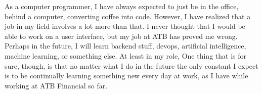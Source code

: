 \documentclass[letterpaper,12pt]{article}
\begin{document}
As a computer programmer, I have always expected to just be in the office, behind a computer,
converting coffee into code. However, I have realized that a job in my field
involves a lot more than that. I never thought that I would be able to work
on a user interface, but my job at ATB has proved me wrong.
Perhaps in the future, I will learn backend stuff, devops, artificial intelligence,
machine learning, or something else. At least in my role, One thing that is for sure, though, is that
no matter what I do in the future the only constant I expect is to be
continually learning something new every day at work, as I have while working
at ATB Financial so far. 




\nocite{*}

\end{document}
